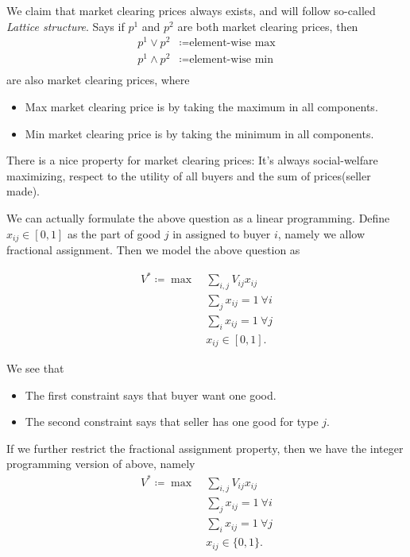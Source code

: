 We claim that market clearing prices always exists, and will follow so-called \emph{Lattice structure}. Says if
\(p^{1}\) and \(p^{2}\) are both market clearing prices, then
\[
	\begin{split}
		p^{1}\lor p^{2} &\coloneqq \text{element-wise max}\\
		p^{1}\land p^{2} &\coloneqq \text{element-wise min}\\
	\end{split}
\]
are also market clearing prices, where
\begin{itemize}
	\item Max market clearing price is by taking the maximum in all components.
	\item Min market clearing price is by taking the minimum in all components.
\end{itemize}


\begin{remark}
	There is a nice property for market clearing prices: It's always social-welfare maximizing, respect to the utility of all buyers
	and the sum of prices(seller made).
\end{remark}

We can actually formulate the above question as a linear programming. Define \(x_{ij} \in [0, 1]\) as the part of
good \(j\) in assigned to buyer \(i\), namely we allow fractional assignment. Then we model the above question as

\begin{align*}
	V^{*} \coloneqq \max~ & \sum\limits_{i, j}V_{ij}x_{ij}       \\
	                      & \sum\limits_{j}x_{ij} = 1\ \forall i \\
	                      & \sum\limits_{i}x_{ij} = 1\ \forall j \\
	                      & x_{ij}\in[0, 1].
\end{align*}
\begin{intuition}
	We see that
	\begin{itemize}
		\item The first constraint says that buyer want one good.
		\item The second constraint says that seller has one good for type \(j\).
	\end{itemize}
\end{intuition}

If we further restrict the fractional assignment property, then we have the integer programming version of above, namely
\begin{align*}
	V^{*} \coloneqq \max~ & \sum\limits_{i, j}V_{ij}x_{ij}       \\
	                      & \sum\limits_{j}x_{ij} = 1\ \forall i \\
	                      & \sum\limits_{i}x_{ij} = 1\ \forall j \\
	                      & x_{ij}\in\{0, 1\}.
\end{align*}


